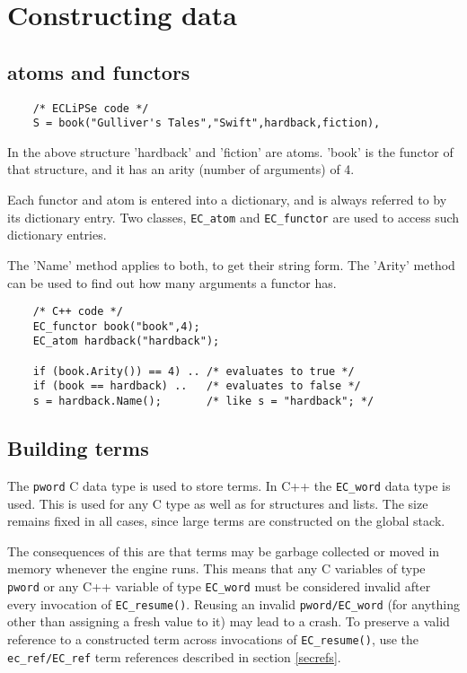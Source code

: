 \section{Constructing {\eclipse} data}
\subsection{{\eclipse} atoms and functors}

\begin{verbatim}
    /* ECLiPSe code */
    S = book("Gulliver's Tales","Swift",hardback,fiction),
\end{verbatim}

In the above structure 'hardback' and 'fiction' are atoms. 'book'
is the functor of that structure, and it has an arity (number
of arguments) of 4.

Each functor and atom is entered into a dictionary, and is always
referred to by its dictionary entry. Two classes, \verb.EC_atom.
and \verb.EC_functor. are used to access such dictionary entries.

The 'Name' method applies to both, to get their string form.
The 'Arity' method can be used to find out how many arguments
a functor has.

\begin{verbatim}
    /* C++ code */
    EC_functor book("book",4);
    EC_atom hardback("hardback");

    if (book.Arity()) == 4) .. /* evaluates to true */
    if (book == hardback) ..   /* evaluates to false */
    s = hardback.Name();       /* like s = "hardback"; */
\end{verbatim}


\subsection{Building {\eclipse} terms}

The \verb.pword. C data type is used to store {\eclipse} terms. In C++ the
\verb.EC_word. data type is used. This is used for any C type as well
as for {\eclipse} structures and lists. The size remains fixed in all
cases, since large terms are constructed on the {\eclipse} global stack.

The consequences of this are that terms may be garbage collected
or moved in memory whenever the {\eclipse} engine runs.
This means that any C variables of type \verb.pword. or any C++ variable
of type \verb.EC_word. must be considered invalid after every invocation
of \verb.EC_resume()..  Reusing an invalid \verb.pword/EC_word. (for anything
other than assigning a fresh value to it) may lead to a crash.
To preserve a valid reference to a constructed term across invocations
of \verb.EC_resume()., use the \verb.ec_ref/EC_ref. term references
described in section \ref{secrefs}.


